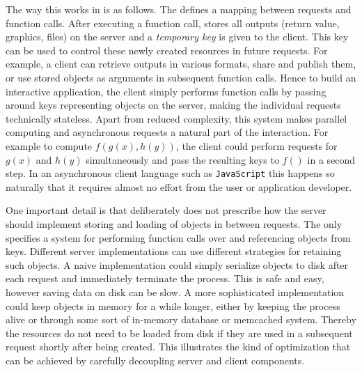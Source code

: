 The way this works in \OpenCPU is as follows. The \API defines a mapping between \HTTP requests and \R function calls. After executing a function call, \OpenCPU stores all outputs (return value, graphics, files) on the server and a \emph{temporary key} is given to the client. This key can be used to control these newly created resources in future requests. For example, a client can retrieve outputs in various formats, share and publish them, or use stored \R objects as arguments in subsequent function calls. Hence to build an interactive application, the client simply performs function calls by passing around keys representing objects on the server, making the individual requests technically stateless. Apart from reduced complexity, this system makes parallel computing and asynchronous requests a natural part of the interaction. For example to compute $f(g(x), h(y))$, the client could perform \RPC requests for $g(x)$ and $h(y)$ simultaneously and pass the resulting keys to $f()$ in a second step. In an asynchronous client language such as \texttt{JavaScript} this happens so naturally that it requires almost no effort from the user or application developer.

One important detail is that \OpenCPU deliberately does not prescribe how the server should implement storing and loading of objects in between requests. The \API only specifies a system for performing \R function calls over \HTTP and referencing objects from keys. Different server implementations can use different strategies for retaining such objects. A naive implementation could simply serialize objects to disk after each request and immediately terminate the process. This is safe and easy, however saving data on disk can be slow. A more sophisticated implementation could keep objects in memory for a while longer, either by keeping the \R process alive or through some sort of in-memory database or memcached system. 
Thereby the resources do not need to be loaded from disk if they are used in a subsequent request shortly after being created. This illustrates the kind of optimization that can be achieved by carefully decoupling server and client components.
